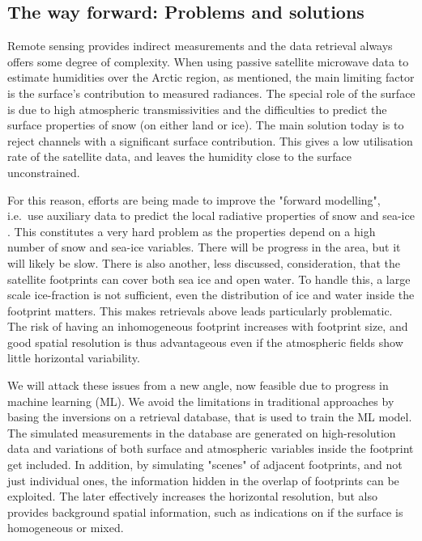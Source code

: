 \documentclass[12pt,oneside,a4paper]{article}
\begin{document}
\subsection{The way forward: Problems and solutions }

Remote sensing provides indirect measurements and the data retrieval always offers some degree of complexity. When using passive satellite microwave data to estimate humidities over the Arctic region, as mentioned, the main limiting factor is the surface's contribution to measured radiances. The special role of the surface is due to high atmospheric transmissivities and the difficulties to predict the surface properties of snow (on either land or ice).
The main solution today is to reject channels with a significant surface
contribution. This gives a low utilisation rate of the satellite data, and
leaves the humidity close to the surface unconstrained.

For this reason, efforts are being made to improve the "forward modelling",
i.e.\ use auxiliary data to predict the local radiative properties of snow and
sea-ice \citep[e.g.][]{tonboe:2010:thesi}. This constitutes a very hard problem
as the properties depend on a high number of snow and sea-ice
variables. There will be progress in the area, but it will likely be slow.
There is also another, less discussed, consideration, that the satellite
footprints can cover both sea ice and open water. To handle this, a large scale
ice-fraction is not sufficient, even the distribution of ice and water inside
the footprint matters. This makes retrievals above leads particularly
problematic. The risk of having an inhomogeneous footprint increases with
footprint size, and good spatial resolution is thus advantageous even if the atmospheric fields show little horizontal variability.



We will attack these issues from a new angle, now feasible due to progress in
machine learning (ML). We avoid the limitations in traditional approaches by
basing the inversions on a retrieval database, that is used to train the ML
model. The simulated measurements in the database are generated on
high-resolution data and variations of both surface and atmospheric variables
inside the footprint get included. In addition, by simulating "scenes" of
adjacent footprints, and not just individual ones, the information hidden in the overlap of footprints can be exploited. The later effectively increases the horizontal resolution, but also provides background spatial information, such as indications on if the surface is homogeneous or mixed.
\end{document}
